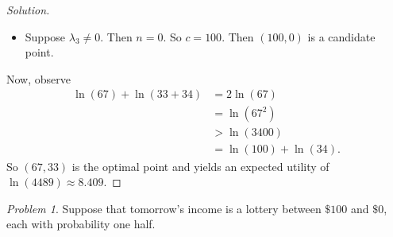 \documentclass[12pt]{article}
\theoremstyle{definition}
\theoremstyle{remark}
\newtheorem{prob}{Problem}[section]
\begin{document}
\begin{proof}[Solution]
\begin{enumerate}
\begin{enumerate}
      \begin{itemize}
        \item Suppose $\lambda_3 \neq 0$. Then $n = 0$. So $c = 100$. Then $(100, 0)$ is a candidate point.
      \end{itemize}
    \end{enumerate}
  \end{enumerate}
  Now, observe
  \begin{align*}
    \ln(67) + \ln(33 + 34) &= 2\ln(67) \\
    &= \ln(67^2) \\
    &> \ln(3400) \\
    &= \ln(100) + \ln(34).
  \end{align*}
  So $(67, 33)$ is the optimal point and yields an expected utility of $\ln(4489) \approx 8.409$.
\end{proof}
\begin{prob}
  Suppose that tomorrow's income is a lottery between $\$ 100 $ and $\$ 0$, each with probability one half.
\end{prob}
\end{document}
